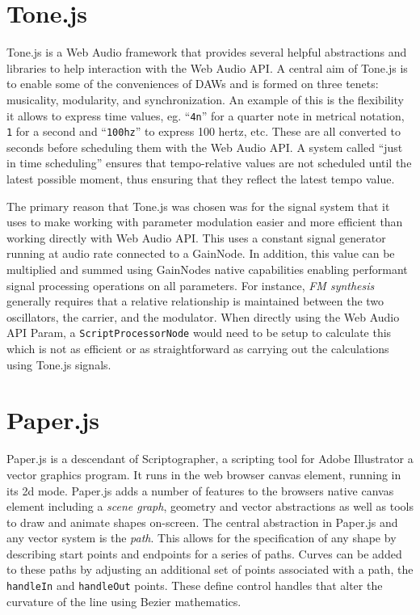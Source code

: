 \documentclass[12pt]{report}
\begin{document}
\section{Tone.js}
\label{sec:org0a3276a}
Tone.js is a Web Audio framework that provides several helpful abstractions and
libraries to help interaction with the Web Audio API. A central aim of Tone.js
is to enable some of the conveniences of DAWs and is formed on three tenets:
musicality, modularity, and synchronization. An example of this is the
flexibility it allows to express time values, eg. ``\texttt{4n}'' for a quarter note in
metrical notation, \texttt{1} for a second and ``\texttt{100hz}'' to express 100 hertz, etc.
These are all converted to seconds before scheduling them with the Web Audio
API. A system called ``just in time scheduling'' ensures that tempo-relative
values are not scheduled until the latest possible moment, thus ensuring that
they reflect the latest tempo value.

The primary reason that Tone.js was chosen was for the signal system that it
uses to make working with parameter modulation easier and more efficient than
working directly with Web Audio API. This uses a constant signal generator
running at audio rate connected to a GainNode. In addition, this value can be
multiplied and summed using GainNodes native capabilities enabling performant
signal processing operations on all parameters. For instance, \emph{FM synthesis}
generally requires that a relative relationship is maintained between the two
oscillators, the carrier, and the modulator. When directly using the Web Audio
API Param, a \texttt{ScriptProcessorNode} would need to be setup to calculate this
which is not as efficient or as straightforward as carrying out the calculations
using Tone.js signals.

\section{Paper.js}
\label{sec:orge9fdc1a}
Paper.js is a descendant of Scriptographer, a scripting tool for Adobe
Illustrator a vector graphics program. It runs in the web browser canvas
element, running in its 2d mode. Paper.js adds a number of features to the
browsers native canvas element including a \emph{scene graph}, geometry and vector
abstractions as well as tools to draw and animate shapes on-screen. The central
abstraction in Paper.js and any vector system is the \emph{path}. This allows for the
specification of any shape by describing start points and endpoints for a series
of paths. Curves can be added to these paths by adjusting an additional set of
points associated with a path, the \texttt{handleIn} and \texttt{handleOut} points. These
define control handles that alter the curvature of the line using Bezier
mathematics.
\end{document}
